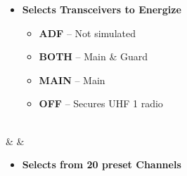 \documentclass[fontInter]{TechCheck}
\begin{document}
\begin{listlongtable}
\begin{minipage}[t]{\linewidth}
			\vspace{-7pt}
			\begin{itemize}
				\item \textbf{Selects Transceivers to Energize}
				\begin{itemize}
					\item \textbf{ADF} -- Not simulated
					\item \textbf{BOTH} --  Main \& Guard
					\item \textbf{MAIN} -- Main
					\item \textbf{OFF} -- Secures UHF 1 radio
				\end{itemize}
			\end{itemize}
		\end{minipage} \\
		\midrule
		\textbf{\textbullet} &  &
		\begin{minipage}[t]{\linewidth}
			\vspace{-7pt}
			\begin{itemize}
				\item \textbf{Selects from 20 preset Channels}
			\end{itemize}
		\end{minipage} \\
	\end{listlongtable}
\end{document}
